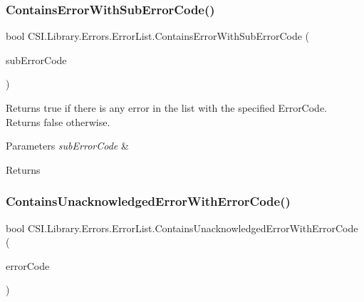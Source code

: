 \subsubsection{\texorpdfstring{ContainsErrorWithSubErrorCode()}{ContainsErrorWithSubErrorCode()}}
{\footnotesize\ttfamily bool C\+S\+I.\+Library.\+Errors.\+Error\+List.\+Contains\+Error\+With\+Sub\+Error\+Code (\begin{DoxyParamCaption}\item[{int}]{sub\+Error\+Code }\end{DoxyParamCaption})\hspace{0.3cm}{\ttfamily [inline]}}



Returns true if there is any error in the list with the specified Error\+Code. Returns false otherwise. 


\begin{DoxyParams}{Parameters}
{\em sub\+Error\+Code} & \\
\hline
\end{DoxyParams}
\begin{DoxyReturn}{Returns}

\end{DoxyReturn}
\mbox{\label{class_c_s_i_1_1_library_1_1_errors_1_1_error_list_a03ec1010e102319969485963a724f838}} 
\subsubsection{\texorpdfstring{ContainsUnacknowledgedErrorWithErrorCode()}{ContainsUnacknowledgedErrorWithErrorCode()}}
{\footnotesize\ttfamily bool C\+S\+I.\+Library.\+Errors.\+Error\+List.\+Contains\+Unacknowledged\+Error\+With\+Error\+Code (\begin{DoxyParamCaption}\item[{\mbox{\hyperlink{namespace_c_s_i_1_1_library_1_1_errors_a5534735de1ef2256eb4c52c7440e30d7}{Enum\+Error\+Codes}}}]{error\+Code }\end{DoxyParamCaption})\hspace{0.3cm}{\ttfamily [inline]}}



